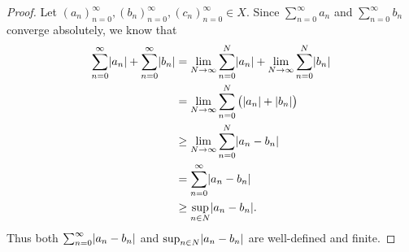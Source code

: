 \begin{proof}
    Let \((a_n)_{n = 0}^\infty, (b_n)_{n = 0}^\infty, (c_n)_{n = 0}^\infty \in X\).
    Since \(\sum_{n = 0}^\infty a_n\) and \(\sum_{n = 0}^\infty b_n\) converge absolutely, we know that
    \begin{align*}
        \sum_{n = 0}^\infty \abs*{a_n} + \sum_{n = 0}^\infty \abs*{b_n} & = \lim_{N \to \infty} \sum_{n = 0}^N \abs*{a_n} + \lim_{N \to \infty} \sum_{n = 0}^N \abs*{b_n} \\
                                                                        & = \lim_{N \to \infty} \sum_{n = 0}^N \big(\abs*{a_n} + \abs*{b_n}\big)                          \\
                                                                        & \geq \lim_{N \to \infty} \sum_{n = 0}^N \abs*{a_n - b_n}                                        \\
                                                                        & = \sum_{n = 0}^\infty \abs*{a_n - b_n}                                                          \\
                                                                        & \geq \sup_{n \in N} \abs*{a_n - b_n}.
    \end{align*}
    Thus both \(\sum_{n = 0}^\infty \abs*{a_n - b_n}\) and \(\sup_{n \in N} \abs*{a_n - b_n}\) are well-defined and finite.


\end{proof}
